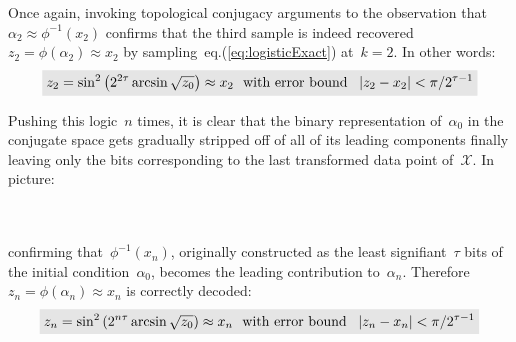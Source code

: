 \documentclass{article}
\newcommand{\highlight}[2][yellow]{\mathchoice%
  {\colorbox{#1}{$\displaystyle#2$}}%
  {\colorbox{#1}{$\textstyle#2$}}%
  {\colorbox{#1}{$\scriptstyle#2$}}%
  {\colorbox{#1}{$\scriptscriptstyle#2$}}}%
\begin{document}
\noindent Once again, invoking topological conjugacy arguments to the observation that~$\alpha_2 \approx \phi^{-1}(x_2)$ confirms that the third sample is indeed recovered~$z_2 = \phi(\alpha_2) \approx x_2$ by sampling~eq.(\ref{eq:logisticExact}) at~$k=2$.  In other words:
\begin{equation*}
\highlight[black!10]{z_2 = \sin^2 \left( 2^{2\tau} \arcsin{\sqrt{z_0}}  \right)  \approx x_2 \,\,\,\, \text{with error bound} \,\,\,\, \left| z_2 - x_2 \right| < \pi / 2^{\tau-1}}  
\end{equation*}

\noindent Pushing this logic~$n$ times, it is clear that the binary representation of~$\alpha_0$ in the conjugate space gets gradually stripped off of all of its leading components finally leaving only the bits corresponding to the last transformed data point of~$\mathcal{X}$.  In picture: \\ \\
\noindent {} \\

\noindent confirming that~$\phi^{-1}(x_n)$, originally constructed as the least signifiant~$\tau$ bits of the initial condition~$\alpha_0$, becomes the leading contribution to~$\alpha_n$.  Therefore~$z_n = \phi(\alpha_n) \approx x_n$ is correctly decoded:
\begin{equation*}
\highlight[black!10]{z_n = \sin^2 \left( 2^{n\tau} \arcsin{\sqrt{z_0}}  \right)  \approx x_n \,\,\,\, \text{with error bound} \,\,\,\, \left| z_n - x_n \right| < \pi / 2^{\tau-1}}  
\end{equation*}
\end{document}
